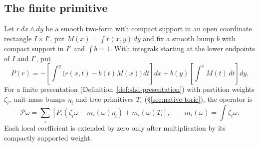 \subsection{The finite primitive}\label{sec:shd-primitive}

\begin{construction}\label{cons:shd-primitive}
Let $r\,dx\wedge dy$ be a smooth two-form with compact support in an open coordinate rectangle $I\times I'$, put
$M(x)=\int r(x,y)\,dy$ and fix a smooth bump $b$ with compact support in $I'$ and $\int b=1$. With integrals starting
at the lower endpoints of $I$ and $I'$, put
\begin{equation}\label{eq:shd-Ploc}
 P(r)=-\left[\int^y\bigl(r(x,t)-b(t)M(x)\bigr)\,dt\right]dx
       +b(y)\left[\int^xM(t)\,dt\right]dy .
\end{equation}
For a finite presentation (Definition~\ref{def:shd-presentation}) with partition weights $\zeta_i$, unit-mass bumps
$\eta_i$ and tree primitives $T_i$ (\S\ref{sec:native-toric}), the operator is
\begin{equation}\label{eq:shd-PSigma}
 \mathcal P\omega=\sum_i\left[P_i(\zeta_i\omega-m_i(\omega)\eta_i)+m_i(\omega)T_i\right],\qquad m_i(\omega)=\int\zeta_i\omega .
\end{equation}
Each local coefficient is extended by zero only after multiplication by its compactly supported weight.
\end{construction}

